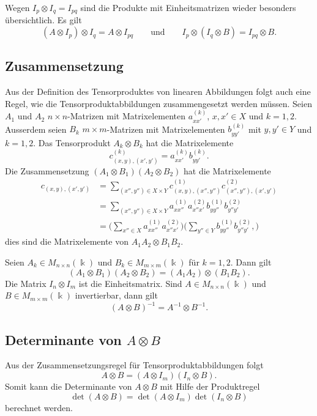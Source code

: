Wegen $I_p\otimes I_q=I_{pq}$ sind die Produkte mit Einheitsmatrizen
wieder besonders übersichtlich.
Es gilt
\begin{equation}
(A\otimes I_p)\otimes I_q
=
A\otimes I_{pq}
\qquad\text{und}\qquad
I_p\otimes (I_q\otimes B)
=
I_{pq}\otimes B.
\label{buch:diskret:tensor:eqn:assozi}
\end{equation}

%
%
\subsection{Zusammensetzung
\label{buch:diskret:tensor:subsection:zusammensetzung}}
Aus der Definition des Tensorproduktes von linearen Abbildungen folgt
auch eine Regel, wie die Tensorproduktabbildungen zusammengesetzt
werden müssen.
Seien $A_1$ und $A_2$ $n\times n$-Matrizen mit Matrixelementen
$a_{xx'}^{(k)}$, $x,x'\in X$ und $k=1,2$.
Ausserdem seien $B_k$ $m\times m$-Matrizen mit Matrixelementen
$b_{yy'}^{(k)}$ mit $y,y'\in Y$ und $k=1,2$.
Das Tensorprodukt $A_k\otimes B_k$ hat die Matrixelemente
\[
c_{(x,y),(x',y')}^{(k)}
=
a_{xx'}^{(k)}
b_{yy'}^{(k)}.
\]
Die Zusammensetzung $(A_1\otimes B_1)(A_2\otimes B_2)$ hat die
Matrixelemente
\begin{align*}
c_{(x,y),(x',y')}
&=
\sum_{(x'',y'')\in X\times Y}
c^{(1)}_{(x,y),(x'',y'')}
c^{(2)}_{(x'',y''),(x',y')}
\\
&=
\sum_{(x'',y'')\in X\times Y}
a^{(1)}_{xx''} a^{(2)}_{x''x'}
b^{(1)}_{yy''} b^{(2)}_{y''y'}
\\
&=
\biggl(
\sum_{x''\in X}
a^{(1)}_{xx''} a^{(2)}_{x''x'}
\biggr)
\biggl(
\sum_{y''\in Y}
b^{(1)}_{yy''} b^{(2)}_{y''y'},
\biggr)
\end{align*}
dies sind die Matrixelemente von $A_1A_2 \otimes B_1B_2$.

\begin{satz}
Seien
$A_k\in M_{n\times n}(\Bbbk)$ und $B_k\in M_{m\times m}(\Bbbk)$
für $k=1,2$.
Dann gilt
\[
(A_1\otimes B_1)(A_2\otimes B_2)
=
(A_1A_2)\otimes (B_1B_2).
\]
Die Matrix $I_n\otimes I_m$ ist die Einheitsmatrix.
Sind $A\in M_{n\times n}(\Bbbk)$ und $B\in M_{m\times m}(\Bbbk)$ 
invertierbar, dann gilt
\[
(A\otimes B)^{-1}
=
A^{-1}\otimes B^{-1}.
\]
\end{satz}

%
%
\subsection{Determinante von $A\otimes B$
\label{buch:diskret:tensor:subsection:determinante}}
Aus der Zusammensetzungsregel für Tensorproduktabbildungen folgt
\[
A\otimes B
=
(A\otimes I_m)(I_n\otimes B).
\]
Somit kann die Determinante von $A\otimes B$ mit Hilfe der
Produktregel
\[
\det (A\otimes B)
=
\det(A\otimes I_m)
\det(I_n\otimes B)
\]
berechnet werden.

